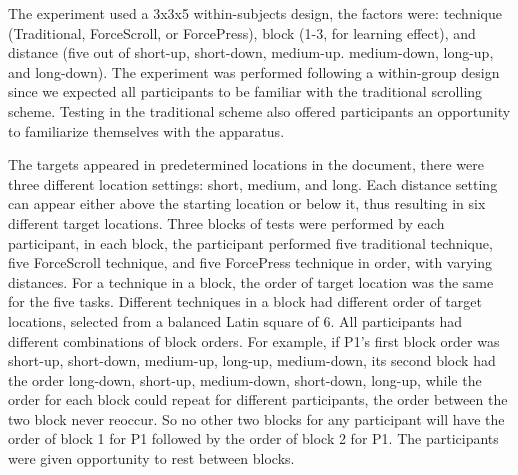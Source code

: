 \documentclass{sigchi}
\begin{document}
The experiment used a 3x3x5 within-subjects design, the factors were: technique (Traditional, ForceScroll, or ForcePress), block (1-3, for learning effect), and distance (five out of short-up, short-down, medium-up. medium-down, long-up, and long-down). The experiment was performed following a within-group design since we expected all participants to be familiar with the traditional scrolling scheme. Testing in the traditional scheme also offered participants an opportunity to familiarize themselves with the apparatus.

The targets appeared in predetermined locations in the document, there were three different location settings: short, medium, and long. Each distance setting can appear either above the starting location or below it, thus resulting in six different target locations. Three blocks of tests were performed by each participant, in each block, the participant performed five traditional technique, five ForceScroll technique, and five ForcePress technique in order, with varying distances. For a technique in a block, the order of target location was the same for the five tasks. Different techniques in a block had different order of target locations, selected from a balanced Latin square of 6. All participants had different combinations of block orders. For example, if P1's first block order was short-up, short-down, medium-up, long-up, medium-down, its second block had the order long-down, short-up, medium-down, short-down, long-up, while the order for each block could repeat for different participants, the order between the two block never reoccur. So no other two blocks for any participant will have the order of block 1 for P1 followed by the order of block 2 for P1. The participants were given opportunity to rest between blocks.
\end{document}
